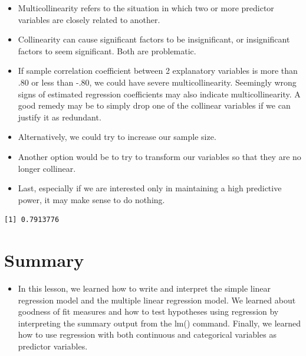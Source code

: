 \documentclass[
  letterpaper,
  DIV=11,
  numbers=noendperiod]{scrreprt}
\newenvironment{Shaded}{\begin{snugshade}}{\end{snugshade}}
\newcommand{\DocumentationTok}[1]{\textcolor[rgb]{0.37,0.37,0.37}{\textit{#1}}}
\newcommand{\FunctionTok}[1]{\textcolor[rgb]{0.28,0.35,0.67}{#1}}
\newcommand{\NormalTok}[1]{\textcolor[rgb]{0.00,0.23,0.31}{#1}}
\newcommand{\SpecialCharTok}[1]{\textcolor[rgb]{0.37,0.37,0.37}{#1}}
\providecommand{\tightlist}{%
  \setlength{\itemsep}{0pt}\setlength{\parskip}{0pt}}\usepackage{longtable,booktabs,array}
\begin{document}
\begin{itemize}
\tightlist
\item
  Multicollinearity refers to the situation in which two or more
  predictor variables are closely related to another.
\item
  Collinearity can cause significant factors to be insignificant, or
  insignificant factors to seem significant. Both are problematic.
\item
  If sample correlation coefficient between 2 explanatory variables is
  more than .80 or less than -.80, we could have severe
  multicollinearity. Seemingly wrong signs of estimated regression
  coefficients may also indicate multicollinearity. A good remedy may be
  to simply drop one of the collinear variables if we can justify it as
  redundant.
\item
  Alternatively, we could try to increase our sample size.
\item
  Another option would be to try to transform our variables so that they
  are no longer collinear.
\item
  Last, especially if we are interested only in maintaining a high
  predictive power, it may make sense to do nothing.
\end{itemize}

\begin{Shaded}
\end{Shaded}

\begin{verbatim}
[1] 0.7913776
\end{verbatim}


\chapter{Summary}\label{summary-10}

\begin{itemize}
\tightlist
\item
  In this lesson, we learned how to write and interpret the simple
  linear regression model and the multiple linear regression model. We
  learned about goodness of fit measures and how to test hypotheses
  using regression by interpreting the summary output from the lm()
  command. Finally, we learned how to use regression with both
  continuous and categorical variables as predictor variables.
\end{itemize}
\end{document}
